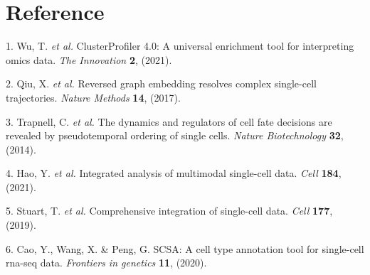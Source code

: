 \documentclass[
]{article}
\newenvironment{cslreferences}%
  {}%
  {\par}
\begin{document}
\hypertarget{bibliography}{%
\section*{Reference}\label{bibliography}}

\hypertarget{refs}{}
\begin{cslreferences}
\leavevmode\hypertarget{ref-ClusterprofilerWuTi2021}{}%
1. Wu, T. \emph{et al.} ClusterProfiler 4.0: A universal enrichment tool for interpreting omics data. \emph{The Innovation} \textbf{2}, (2021).

\leavevmode\hypertarget{ref-ReversedGraphQiuX2017}{}%
2. Qiu, X. \emph{et al.} Reversed graph embedding resolves complex single-cell trajectories. \emph{Nature Methods} \textbf{14}, (2017).

\leavevmode\hypertarget{ref-TheDynamicsAnTrapne2014}{}%
3. Trapnell, C. \emph{et al.} The dynamics and regulators of cell fate decisions are revealed by pseudotemporal ordering of single cells. \emph{Nature Biotechnology} \textbf{32}, (2014).

\leavevmode\hypertarget{ref-IntegratedAnalHaoY2021}{}%
4. Hao, Y. \emph{et al.} Integrated analysis of multimodal single-cell data. \emph{Cell} \textbf{184}, (2021).

\leavevmode\hypertarget{ref-ComprehensiveIStuart2019}{}%
5. Stuart, T. \emph{et al.} Comprehensive integration of single-cell data. \emph{Cell} \textbf{177}, (2019).

\leavevmode\hypertarget{ref-ScsaACellTyCaoY2020}{}%
6. Cao, Y., Wang, X. \& Peng, G. SCSA: A cell type annotation tool for single-cell rna-seq data. \emph{Frontiers in genetics} \textbf{11}, (2020).
\end{cslreferences}
\end{document}

